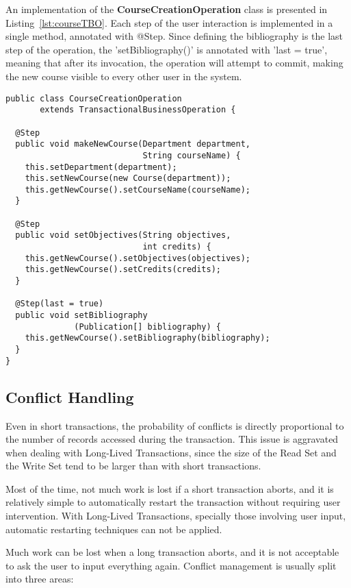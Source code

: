 \documentclass{llncs}
\begin{document}
An implementation of the {\bf CourseCreationOperation} class is
presented in Listing~\ref{lst:courseTBO}. Each step of the user
interaction is implemented in a single method, annotated with
@Step. Since defining the bibliography is the last step of the
operation, the 'setBibliography()' is annotated with 'last = true',
meaning that after its invocation, the operation will attempt to
commit, making the new course visible to every other user in the
system.

\begin{lstlisting}[float]
public class CourseCreationOperation 
       extends TransactionalBusinessOperation {    

  @Step
  public void makeNewCourse(Department department,
                            String courseName) {
    this.setDepartment(department);
    this.setNewCourse(new Course(department));
    this.getNewCourse().setCourseName(courseName);
  }

  @Step
  public void setObjectives(String objectives,
                            int credits) {
    this.getNewCourse().setObjectives(objectives);
    this.getNewCourse().setCredits(credits);
  }

  @Step(last = true)
  public void setBibliography
              (Publication[] bibliography) {
    this.getNewCourse().setBibliography(bibliography);
  }
}
\end{lstlisting}

\subsection{Conflict Handling}

Even in short transactions, the probability of conflicts is directly
proportional to the number of records accessed during the
transaction. This issue is aggravated when dealing with Long-Lived
Transactions, since the size of the Read Set and the Write Set tend to
be larger than with short transactions.

Most of the time, not much work is lost if a short transaction aborts,
and it is relatively simple to automatically restart the transaction
without requiring user intervention. With Long-Lived Transactions,
specially those involving user input, automatic restarting techniques
can not be applied.

Much work can be lost when a long transaction aborts, and it is not
acceptable to ask the user to input everything again. Conflict
management is usually split into three areas:
\end{document}
